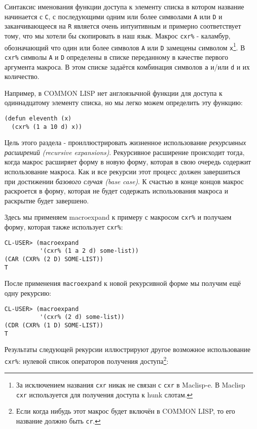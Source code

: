 Синтаксис именования функции доступа к элементу списка в котором название начинается с \verb"C", с последующими одним или более символами \verb"A" или \verb"D" и заканчивающееся на \verb"R" является очень интуитивным и примерно соответствует тому, что мы хотели бы скопировать в наш язык. Макрос \verb"cxr%" - каламбур, обозначающий что один или более символов \verb"A" или \verb"D" замещены символом \verb"x"\footnote{За исключением названия \verb"cxr" никак не связан с \verb"cxr" в Maclisp-e. В Maclisp \verb"cxr" используется для получения доступа к hunk слотам.}. В \verb"cxr%" символы \verb"A" и \verb"D" определены в списке переданному в качестве первого аргумента макроса. В этом списке задаётся комбинация символов \verb"a" и/или \verb"d" и их количество.



Например, в COMMON LISP нет англоязычной функции для доступа к одиннадцатому элементу списка, но мы легко можем определить эту функцию:

\begin{verbatim}
(defun eleventh (x)
  (cxr% (1 a 10 d) x))
\end{verbatim}

Цель этого раздела - проиллюстрировать жизненное использование \emph{рекурсивных расширений (recursive expansions)}. Рекурсивное расширение происходит тогда, когда макрос расширяет форму в новую форму, которая в свою очередь содержит использование макроса. Как и все рекурсии этот процесс должен завершиться при достижении \emph{базового случая (base case)}. К счастью в конце концов макрос раскроется в форму, которая не будет содержать использования макроса и раскрытие будет завершено.

Здесь мы применяем macroexpand к примеру с макросом \verb"cxr%" и получаем форму, которая также использует \verb"cxr%":

\begin{verbatim}
CL-USER> (macroexpand
          '(cxr% (1 a 2 d) some-list))
(CAR (CXR% (2 D) SOME-LIST))
T
\end{verbatim}

После применения \verb"macroexpand" к новой рекурсивной форме мы получим ещё одну рекурсию:

\begin{verbatim}
CL-USER> (macroexpand
          '(cxr% (2 d) some-list))
(CDR (CXR% (1 D) SOME-LIST))
T
\end{verbatim}

Результаты следующей рекурсии иллюстрируют другое возможное использование \verb"cxr%": нулевой список операторов получения доступа\footnote{Если когда нибудь этот макрос будет включён в COMMON LISP, то его название должно быть \verb"cr".}:




